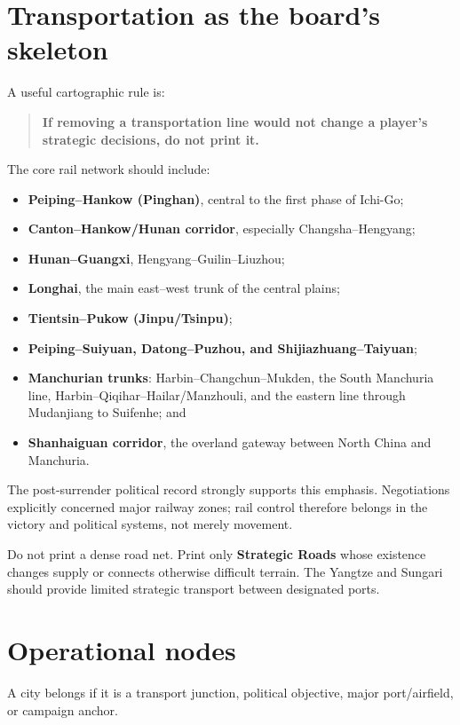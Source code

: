 \documentclass[11pt]{article}
\begin{document}
\section{Transportation as the board's skeleton}
A useful cartographic rule is:
\begin{quote}\textbf{If removing a transportation line would not change a player's strategic decisions, do not print it.}\end{quote}

The core rail network should include:
\begin{itemize}
\item \textbf{Peiping--Hankow (Pinghan)}, central to the first phase of Ichi-Go;
\item \textbf{Canton--Hankow/Hunan corridor}, especially Changsha--Hengyang;
\item \textbf{Hunan--Guangxi}, Hengyang--Guilin--Liuzhou;
\item \textbf{Longhai}, the main east--west trunk of the central plains;
\item \textbf{Tientsin--Pukow (Jinpu/Tsinpu)};
\item \textbf{Peiping--Suiyuan, Datong--Puzhou, and Shijiazhuang--Taiyuan};
\item \textbf{Manchurian trunks}: Harbin--Changchun--Mukden, the South Manchuria line, Harbin--Qiqihar--Hailar/Manzhouli, and the eastern line through Mudanjiang to Suifenhe; and
\item \textbf{Shanhaiguan corridor}, the overland gateway between North China and Manchuria.
\end{itemize}

The post-surrender political record strongly supports this emphasis. Negotiations explicitly concerned major railway zones; rail control therefore belongs in the victory and political systems, not merely movement.

Do not print a dense road net. Print only \textbf{Strategic Roads} whose existence changes supply or connects otherwise difficult terrain. The Yangtze and Sungari should provide limited strategic transport between designated ports.

\section{Operational nodes}
A city belongs if it is a transport junction, political objective, major port/airfield, or campaign anchor.
\end{document}
